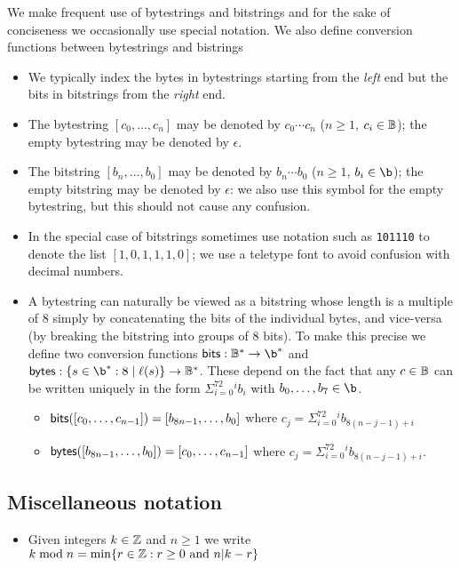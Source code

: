 We make frequent use of bytestrings and bitstrings and for the sake of
conciseness we occasionally use special notation.  We also define conversion
functions between bytestrings and bistrings

\begin{itemize}
\item We typically index the bytes in bytestrings starting from the
  \textit{left} end but the bits in bitstrings from the \textit{right} end.

\item The bytestring $[c_0, \ldots, c_n]$ may be denoted by $c_0{\cdots}c_n$ ($n
  \geq 1$, $c_i \in \mathbb{B}$);  the empty bytestring may be denoted by $\epsilon$.

\item The bitstring $[b_n, \ldots, b_0]$ may be denoted by $b_n{\cdots}b_0$ ($n
  \geq 1$, $b_i \in \b$); the empty bitstring may be denoted by $\epsilon$: we
  also use this symbol for the empty bytestring, but this should not cause any
  confusion.

\item In the special case of bitstrings sometimes use notation such as
  \texttt{101110} to denote the list $[1,0,1,1,1,0]$; we use a teletype font to
  avoid confusion with decimal numbers.

\item A bytestring can naturally be viewed as a bitstring whose length is a
  multiple of 8 simply by concatenating the bits of the individual bytes, and
  vice-versa (by breaking the bitstring into groups of 8 bits).  To make this
  precise we define two conversion functions $\bitsof: \B^* \rightarrow \b^*$
  and $\bytesof: \{s \in \b^* : 8 \mid \length(s)\} \rightarrow \B^*$.  These
  depend on the fact that any $c \in \mathbb{B}$ can be written uniquely in the form
  $\Sigma_{i=0}^72^ib_i$ with $b_0, \ldots, b_7 \in \b$.
  \begin{itemize}
    \item $\mathsf{bits}([c_0, \ldots, c_{n-1}]) = [b_{8n-1}, \ldots, b_0]$ where $c_j=\Sigma_{i=0}^72^ib_{8(n-j-1)+i}$
    \item $\mathsf{bytes}([b_{8n-1}, \ldots, b_0]) = [c_0, \ldots, c_{n-1}]$ where $c_j=\Sigma_{i=0}^72^ib_{8(n-j-1)+i}$.
  \end{itemize}
\end{itemize}

\subsection{Miscellaneous notation}
\begin{itemize}
\item Given integers $k \in \mathbb{Z}$ and $n \geq 1$ we write $k \bmod n = \min\{r \in \mathbb{Z}: r \geq 0 \text{ and } n | k - r \}$
\end{itemize}


